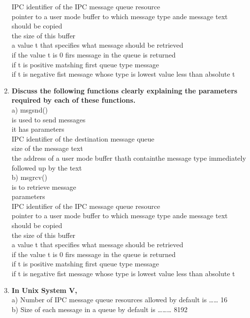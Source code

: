 \documentclass[a4paper,12pt]{article}
\begin{document}
\begin{flushleft}
\begin{enumerate}
{IPC identifier of the IPC message queue resource\\
pointer to a user mode buffer to which message type ande message text should be copied\\
the size of this buffer\\
a value t that specifies what message should be retrieved\\
if the value t is 0 firs message in the queue is returned\\
if t is positive matshing first queue type message\\
if t is negative fist message whose type is lowest value less than absolute t}\\
\item \textbf{ Discuss the following functions clearly explaining the parameters required by each of these functions.}\\
a) msgsnd()\\
{\color{red} is used to send messages\\
it has parameters\\
IPC identifier of the destination message queue\\
size of the message text\\
the address of a user mode buffer thath containthe message type immediately followed up by the text}\\
 b) msgrcv()\\
 {\color{red}is to retrieve message\\
parameters\\
IPC identifier of the IPC message queue resource\\
pointer to a user mode buffer to which message type ande message text should be copied\\
the size of this buffer\\
a value t that specifies what message should be retrieved\\
if the value t is 0 firs message in the queue is returned\\
if t is positive matshing first queue type message\\
if t is negative fist message whose type is lowest value less than absolute t}\\
\item \textbf{ In Unix System V,}\\
a) Number of IPC message queue resources allowed by default is ……
{\color{red}16}\\
b) Size of each message in a queue by default is ………
{\color{red}8192}\\

\end{enumerate}
\end{flushleft}
\end{document}
